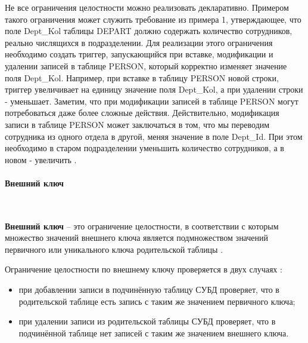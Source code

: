Не все ограничения целостности можно реализовать декларативно. Примером такого ограничения может служить требование из примера 1, утверждающее, что поле Dept\_Kol таблицы DEPART должно содержать количество сотрудников, реально числящихся в подразделении. Для реализации этого ограничения необходимо создать триггер, запускающийся при вставке, модификации и удалении записей в таблице PERSON, который корректно изменяет значение поля Dept\_Kol. Например, при вставке в таблицу PERSON новой строки, триггер увеличивает на единицу значение поля Dept\_Kol, а при удалении строки - уменьшает. Заметим, что при модификации записей в таблице PERSON могут потребоваться даже более сложные действия. Действительно, модификация записи в таблице PERSON может заключаться в том, что мы переводим сотрудника из одного отдела в другой, меняя значение в поле Dept\_Id. При этом необходимо в старом подразделении уменьшить количество сотрудников, а в новом - увеличить \autocite{TransCit}.
\paragraph{Внешний ключ} ~\\
\begin{grayquote}
\textbf{Внешний ключ} – это ограничение целостности, в соответствии с которым
множество значений внешнего ключа является подмножеством значений
первичного или уникального ключа родительской таблицы \autocite{Karpova2009}.
\end{grayquote}

Ограничение целостности по внешнему ключу проверяется в двух случаях \autocite{Karpova2009}:
\begin{itemize}
    \item при добавлении записи в подчинённую таблицу СУБД проверяет, что в
родительской таблице есть запись с таким же значением первичного
ключа;
    \item при удалении записи из родительской таблицы СУБД проверяет, что в
подчинённой таблице нет записей с таким же значением внешнего ключа.
\end{itemize}

